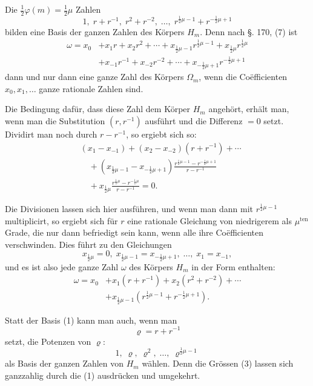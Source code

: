 \documentclass[12pt,a4paper]{article}
\begin{document}
Die $\frac{1}{2}\varphi(m) = \frac{1}{2}\mu$ Zahlen
\begin{equation}\label{eq:176-1}
1,\; r + r^{-1},\; r^2 + r^{-2},\; \ldots,\; r^{\frac{1}{2}\mu-1} + r^{-\frac{1}{2}\mu+1}
\end{equation}
bilden eine Basis der ganzen Zahlen des Körpers $H_m$. Denn nach \S. 170, (7) ist
\begin{equation}\label{eq:176-2}
\begin{aligned}
\omega = x_0 &+ x_1 r + x_2 r^2 + \cdots + x_{\frac{1}{2}\mu-1} r^{\frac{1}{2}\mu-1} + x_{\frac{1}{2}\mu} r^{\frac{1}{2}\mu}\\
&+ x_{-1} r^{-1} + x_{-2} r^{-2} + \cdots + x_{-\frac{1}{2}\mu+1} r^{-\frac{1}{2}\mu+1}
\end{aligned}
\end{equation}
dann und nur dann eine ganze Zahl des Körpers $\Omega_m$, wenn die Coëfficienten $x_0, x_1, \ldots$ ganze rationale Zahlen sind.

Die Bedingung dafür, dass diese Zahl dem Körper $H_m$ angehört, erhält man, wenn man die Substitution $(r, r^{-1})$ ausführt und die Differenz $= 0$ setzt. Dividirt man noch durch $r - r^{-1}$, so ergiebt sich so:
\begin{align*}
&(x_1 - x_{-1}) + (x_2 - x_{-2})(r + r^{-1}) + \cdots\\
&\quad + (x_{\frac{1}{2}\mu-1} - x_{-\frac{1}{2}\mu+1}) \frac{r^{\frac{1}{2}\mu-1} - r^{-\frac{1}{2}\mu+1}}{r - r^{-1}}\\
&\quad + x_{\frac{1}{2}\mu} \frac{r^{\frac{1}{2}\mu} - r^{-\frac{1}{2}\mu}}{r - r^{-1}} = 0.
\end{align*}

Die Divisionen lassen sich hier ausführen, und wenn man dann mit $r^{\frac{1}{2}\mu-1}$ multiplicirt, so ergiebt sich für $r$ eine rationale Gleichung von niedrigerem als $\mu^{\text{ten}}$ Grade, die nur dann befriedigt sein kann, wenn alle ihre Coëfficienten verschwinden. Dies führt zu den Gleichungen
\[
x_{\frac{1}{2}\mu} = 0,\; x_{\frac{1}{2}\mu-1} = x_{-\frac{1}{2}\mu+1},\; \ldots,\; x_1 = x_{-1},
\]
und es ist also jede ganze Zahl $\omega$ des Körpers $H_m$ in der Form enthalten:
\begin{align*}
\omega = x_0 &+ x_1(r + r^{-1}) + x_2(r^2 + r^{-2}) + \cdots\\
&+ x_{\frac{1}{2}\mu-1}(r^{\frac{1}{2}\mu-1} + r^{-\frac{1}{2}\mu+1}).
\end{align*}

Statt der Basis (1) kann man auch, wenn man
\[
\varrho = r + r^{-1}
\]
setzt, die Potenzen von $\varrho$:
\begin{equation}\label{eq:176-3}
1,\; \varrho,\; \varrho^2,\; \ldots,\; \varrho^{\frac{1}{2}\mu-1}
\end{equation}
als Basis der ganzen Zahlen von $H_m$ wählen. Denn die Grössen (3) lassen sich ganzzahlig durch die (1) ausdrücken und umgekehrt.
\end{document}
